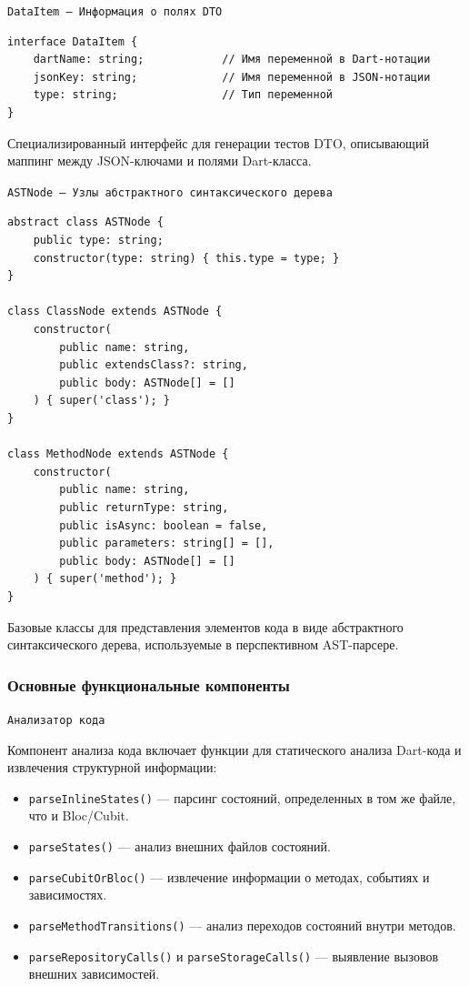 \documentclass[14pt, russian]{scrartcl}
\begin{document}
\texttt{DataItem — Информация о полях DTO}

\begin{verbatim}
interface DataItem {
    dartName: string;            // Имя переменной в Dart-нотации
    jsonKey: string;             // Имя переменной в JSON-нотации
    type: string;                // Тип переменной
}
\end{verbatim}

Специализированный интерфейс для генерации тестов DTO, описывающий маппинг между JSON-ключами и полями Dart-класса.

\texttt{ASTNode — Узлы абстрактного синтаксического дерева}

\begin{verbatim}
abstract class ASTNode {
    public type: string;
    constructor(type: string) { this.type = type; }
}

class ClassNode extends ASTNode {
    constructor(
        public name: string,
        public extendsClass?: string,
        public body: ASTNode[] = []
    ) { super('class'); }
}

class MethodNode extends ASTNode {
    constructor(
        public name: string,
        public returnType: string,
        public isAsync: boolean = false,
        public parameters: string[] = [],
        public body: ASTNode[] = []
    ) { super('method'); }
}
\end{verbatim}

Базовые классы для представления элементов кода в виде абстрактного синтаксического дерева, используемые в перспективном AST-парсере.

\subsubsection{Основные функциональные компоненты}

\texttt{Анализатор кода}

Компонент анализа кода включает функции для статического анализа Dart-кода и извлечения структурной информации:

\begin{itemize}
    \item \texttt{parseInlineStates()} — парсинг состояний, определенных в том же файле, что и Bloc/Cubit.
    \item \texttt{parseStates()} — анализ внешних файлов состояний.
    \item \texttt{parseCubitOrBloc()} — извлечение информации о методах, событиях и зависимостях.
    \item \texttt{parseMethodTransitions()} — анализ переходов состояний внутри методов.
    \item \texttt{parseRepositoryCalls()} и \texttt{parseStorageCalls()} — выявление вызовов внешних зависимостей.
\end{itemize}
\end{document}
